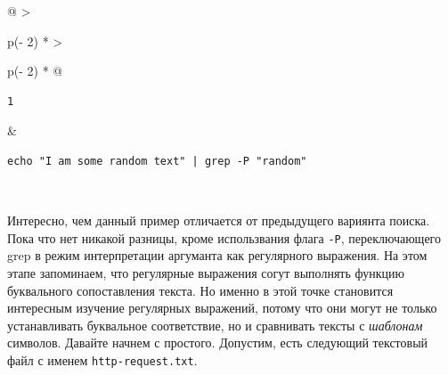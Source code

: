 \documentclass{article}
\begin{document}
\begin{longtable}[]{@{}
  >{\raggedright\arraybackslash}p{(\columnwidth - 2\tabcolsep) * }
  >{\raggedright\arraybackslash}p{(\columnwidth - 2\tabcolsep) * }@{}}
\toprule
\endhead
\begin{minipage}[t]{\linewidth}\raggedright
\begin{verbatim}
1
\end{verbatim}
\end{minipage} & \begin{minipage}[t]{\linewidth}\raggedright
\begin{verbatim}
echo "I am some random text" | grep -P "random"
\end{verbatim}
\end{minipage} \\ \addlinespace
\bottomrule
\end{longtable}

Интересно, чем данный пример отличается от предыдущего вариянта поиска.
Пока что нет никакой разницы, кроме использвания флага \texttt{-P},
переключающего grep в режим интерпретации аргуманта как регулярного
выражения. На этом этапе запоминаем, что регулярные выражения согут
выполнять функцию буквального сопоставления текста. Но именно в этой
точке становится интересным изучение регулярных выражений, потому что
они могут не только устанавливать буквальное соответствие, но и
сравнивать тексты с \emph{шаблонам} символов. Давайте начнем с простого.
Допустим, есть следующий текстовый файл с именем
\texttt{http-request.txt}.
\end{document}
